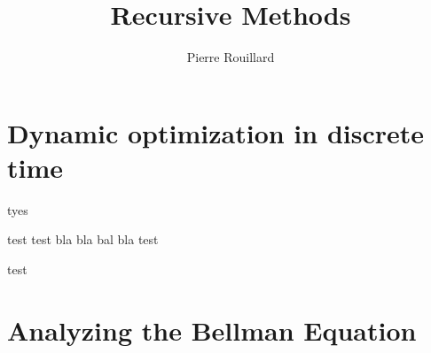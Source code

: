 \documentclass[letterpaper,12pt,leqno]{article}
\begin{document}
\title{Recursive Methods}
\author{Pierre Rouillard}
\date{}

\begin{titlepage}
\maketitle
\tableofcontents
\end{titlepage}

\section{Dynamic optimization in discrete time}\label{sec:lec1}
\begin{definition}
    tyes
\end{definition}

\begin{boxH}
    \begin{theorem}
        test test bla bla bal bla  test
    \end{theorem}
\end{boxH}

\begin{proposition}
    test
\end{proposition}

\section{Analyzing the Bellman Equation}\label{sec:lec2}
\end{document}
